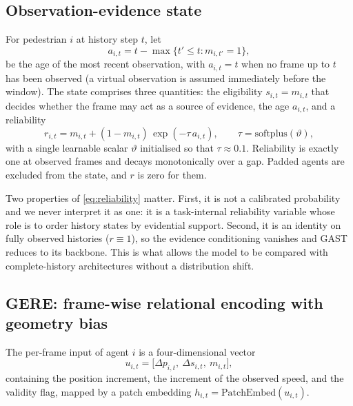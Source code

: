 \subsection{Observation-evidence state}
\label{sec:oes}

For pedestrian $i$ at history step $t$, let
\begin{equation}
a_{i,t}=t-\max\{t'\le t: m_{i,t'}=1\},
\label{eq:age}
\end{equation}
be the age of the most recent observation, with $a_{i,t}=t$ when no frame up to $t$ has been observed (a virtual observation is assumed immediately before the window). The state comprises three quantities: the eligibility $s_{i,t}=m_{i,t}$ that decides whether the frame may act as a source of evidence, the age $a_{i,t}$, and a reliability
\begin{equation}
r_{i,t}=m_{i,t}+(1-m_{i,t})\,\exp(-\tau\,a_{i,t}),\qquad \tau=\mathrm{softplus}(\vartheta),
\label{eq:reliability}
\end{equation}
with a single learnable scalar $\vartheta$ initialised so that $\tau\approx0.1$. Reliability is exactly one at observed frames and decays monotonically over a gap. Padded agents are excluded from the state, and $r$ is zero for them.

Two properties of \eqref{eq:reliability} matter. First, it is not a calibrated probability and we never interpret it as one: it is a task-internal reliability variable whose role is to order history states by evidential support. Second, it is an identity on fully observed histories ($r\equiv1$), so the evidence conditioning vanishes and GAST reduces to its backbone. This is what allows the model to be compared with complete-history architectures without a distribution shift.

\subsection{GERE: frame-wise relational encoding with geometry bias}
\label{sec:gere}

The per-frame input of agent $i$ is a four-dimensional vector
\begin{equation}
u_{i,t}=\big[\Delta p_{i,t},\ \Delta s_{i,t},\ m_{i,t}\big],
\label{eq:input}
\end{equation}
containing the position increment, the increment of the observed speed, and the validity flag, mapped by a patch embedding $h_{i,t}=\mathrm{PatchEmbed}(u_{i,t})$.


